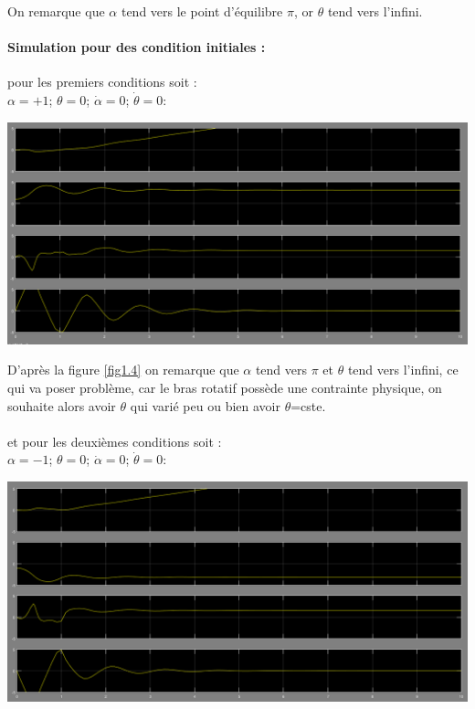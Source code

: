 \documentclass[12pt, a4paper, openany]{report}
\begin{document}
 On remarque que $\alpha$ tend vers le point d'équilibre $\pi$, or $\theta$ tend vers l'infini.


 \paragraph{Simulation pour des condition initiales :\\} 
 
 pour les premiers conditions soit :\\
$\alpha=+1$; $\theta=0$; $\dot{\alpha}=0$; $\dot{\theta} = 0:$ \\
                                                   
\begin{center}
\includegraphics[scale=0.4]{alpha=+1.PNG}
\label{fig1.4} 
\end{center}
 
D’après la figure \ref{fig1.4} on remarque que $\alpha$ tend vers $\pi$ et $\theta$
tend vers l'infini, ce qui va poser problème, car le bras rotatif possède une contrainte physique, on souhaite alors avoir $\theta$ qui varié peu ou bien avoir $\theta$=cste.\\\\  
 
et pour les deuxièmes conditions soit :\\
$\alpha=-1$; $\theta=0$; $\dot{\alpha}=0$; $\dot{\theta} = 0:$ \\
                                                   
\begin{center}
\includegraphics[scale=0.4]{alpha=-1.PNG}
\label{fig1.5} 
\end{center}
\end{document}
